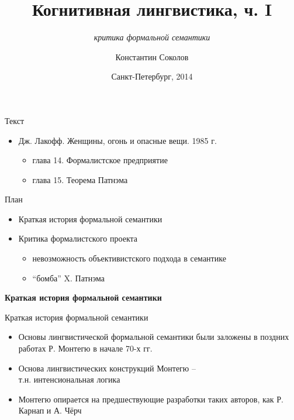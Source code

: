 \documentclass{beamer}
\begin{document}
\title{\Large{Когнитивная лингвистика, ч. I}}
\subtitle{\textit{критика формальной семантики}}
\author{Константин Соколов}
\date{Санкт-Петербург, 2014} 
\begin{frame}
    \thispagestyle{empty}
    \titlepage
\end{frame}

\begin{frame}{Текст}
\setcounter{framenumber}{1}
\begin{itemize}
	\item Дж. Лакофф. Женщины, огонь и опасные вещи. 1985 г.
	    \medskip
	    \begin{itemize}
	        \item глава 14. Формалистское предприятие
    	    \medskip
	        \item глава 15. Теорема Патнэма
	    \end{itemize}
\end{itemize}
\end{frame}

\begin{frame}{План}
    \begin{itemize}
        \item Краткая история формальной семантики
        \medskip
        \item Критика формалистского проекта
        	\smallskip
        	\begin{itemize}
				\item невозможность объективистского подхода в семантике
				\smallskip
				\item ``бомба'' X. Патнэма
        	\end{itemize}
    \end{itemize}
\end{frame}

\begin{frame}{}
\begin{center}
	\textbf{Краткая история формальной семантики}
\end{center}
\end{frame}

\begin{frame}{Краткая история формальной семантики}
\begin{itemize}
	\item Основы лингвистической формальной семантики были заложены в поздних работах Р. Монтегю в начале 70-х гг.
	\medskip
	\item Основа лингвистических конструкций Монтегю --\\ т.н. интенсиональная логика
	\medskip
	\item Монтегю опирается на предшествующие разработки таких авторов, как Р. Карнап и А. Чёрч
\end{itemize}
\end{frame}
\end{document}
